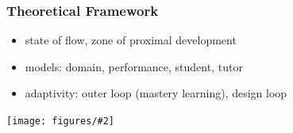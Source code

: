 \documentclass[bigger]{beamer}
\newcommand{\img}[2]{
  \begin{center}
    \texttt{[image: figures/\#2]}
  \end{center}
}
\begin{document}
\begin{frame}
\end{frame}


\begin{frame}
  \frametitle{Theoretical Framework}

  \begin{itemize}
  \item state of flow, zone of proximal development

  \item models: domain, performance, student, tutor

  \item adaptivity: outer loop (mastery learning), design loop %
  \end{itemize}

  \img{0.9}{robomission-tutor-model}

\end{frame}
\end{document}
